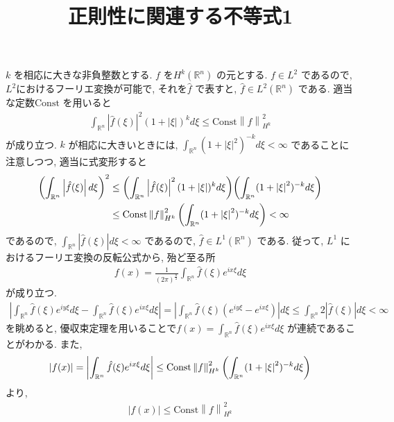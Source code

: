 \documentclass[10pt, fleqn, label-section=none]{bxjsarticle}
\title{正則性に関連する不等式1}
\date{}
\author{}
\theoremstyle{definition}
\newcommand{\paren}[1]{\mleft( #1\mright )}
\newcommand{\abs}[1]{\left|#1\right|}
\newcommand{\norm}[1]{\left\|#1\right\|}
\newcommand{\Const}{\textrm{Const}}
\renewcommand{\;}{\, ; \,}
\begin{document}
\maketitle


\section{}

$k$ を相応に大きな非負整数とする. $f $ を$ H^k(\mathbb R^n)$ の元とする. $f \in L^2$ であるので, $L^2$におけるフーリエ変換が可能で, それを$\hat f$ で表すと, $\hat f \in L^2 (\mathbb R^n)$ である. 適当な定数$\Const$ を用いると
\begin{align*} \int_{\mathbb R^n} \abs{\hat f (\xi)}^2 (1 + \abs \xi )^k d\xi  \leq \Const \norm{f}_{H^k}^2 \end{align*}
が成り立つ. $k$ が相応に大きいときには, $\int_{\mathbb R^n} (1 + \abs{\xi }^2 )^{-k}  d\xi < \infty$ であることに注意しつつ, 適当に式変形すると
\begin{align*} \paren{\int_{\mathbb R^n} \abs{\hat f (\xi) } d\xi}^2 &\leq \paren{\int_{\mathbb R^n} \abs{\hat f (\xi)} ^2 (1 + \abs \xi ) ^k d \xi}\paren{\int_{\mathbb R^n} (1 + \abs{\xi }^2 )^{-k}  d\xi } \\
&\leq \Const \norm{f}^2_{H^k} \paren{\int_{\mathbb R^n} (1 + \abs{\xi }^2 )^{-k}  d\xi } < \infty \end{align*}
であるので, $\int_{\mathbb R^n} \abs{\hat f (\xi) } d\xi < \infty$ であるので, $\hat f \in L^1 (\mathbb R^n)$ である. 従って, $L^1$ におけるフーリエ変換の反転公式から, 殆ど至る所
\begin{align*} f(x) = \frac{1}{(2 \pi)^{\frac{n}{2}} } \int_{\mathbb R^n} \hat f (\xi) e^{ix \xi} d\xi  \end{align*}
が成り立つ.
\begin{align*} \abs {\int_{\mathbb R^n} \hat f (\xi) e^{iy \xi} d\xi - \int_{\mathbb R^n} \hat f (\xi) e^{ix \xi} d\xi } = \abs{\int_{\mathbb R^n} \hat f (\xi) (e^{iy \xi}  - e^{ix \xi} )} d\xi \leq \int_{\mathbb R^n} 2 \abs{\hat f (\xi)}  d\xi   < \infty  \end{align*}
を眺めると, 優収束定理を用いることで$f(x) = \int_{\mathbb R^n} \hat f (\xi) e^{ix \xi} d\xi $ が連続であることがわかる. 
また, 
\begin{align*} \abs{f(x)} = \abs{\int_{\mathbb R^n} \hat f (\xi) e^{ix \xi} d\xi} \leq \Const \norm{f}^2_{H^k} \paren{\int_{\mathbb R^n} (1 + \abs{\xi }^2 )^{-k}  d\xi }  \end{align*}
より, 
\begin{align*} \abs{f(x)} \leq \Const \norm{f}^2_{H^k}  \end{align*}
\end{document}
